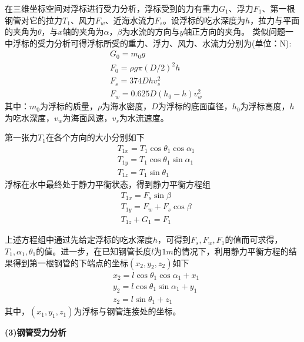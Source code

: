             \par
            在三维坐标空间对浮标进行受力分析，浮标受到的力有重力$G_1$、浮力$F_1$、第一根钢管对它的拉力$T_1$、风力$F_w$、近海水流力$F_s$。设浮标的吃水深度为$h$，拉力与平面的夹角为$\theta$，与$x$轴的夹角为$\alpha$，$\beta$为水流的方向与$y$轴正方向的夹角。
            类似问题一中浮标的受力分析可得浮标所受的重力、浮力、风力、水流力分别为(单位：N):
            \begin{align*}
            & G_0 = m_0g\\
            & F_0 = \rho g\pi ( D/2 )^2h\\
            & F_s = 374Dhv_s^2\\
            & F_w = 0.625D(h_0-h)v_w^2
            \end{align*}
            其中：$m_0$为浮标的质量，$\rho$为海水密度，$D$为浮标的底面直径，$h_0$为浮标高度，$h$为吃水深度，$v_w$为海面风速，$v_s$为水流速度。
            \par
            第一张力$T_1$在各个方向的大小分别如下
            \begin{align*}
            & T_{1x} = T_1\cos\theta_1\cos\alpha_1\\
            & T_{1y} = T_1\cos\theta_1\sin\alpha_1\\
            & T_{1z} = T_1\sin \theta_1
            \end{align*}
            浮标在水中最终处于静力平衡状态，得到静力平衡方程组
            \begin{align*}
            & T_{1x} = F_s\sin \beta\\
            & T_{1y} = F_w + F_s\cos\beta\\
            & T_{1z} + G_1 = F_1
            \end{align*}
            \par
            上述方程组中通过先给定浮标的吃水深度$h$，可得到$F_s,F_w,F_1$的值而可求得，$T_1,\alpha_1,\theta_1$的值。进一步，在已知钢管长度$l$为$1m$的情况下，利用静力平衡方程的结果得到第一根钢管的下端点的坐标$(x_2,y_2,z_2)$如下
            \begin{align*}
            & x_2 = l\cos\theta_1\cos\alpha_1+x_1\\
            & y_2 = l\cos\theta_1\sin\alpha_1+y_1\\
            & z_2 = l\sin\theta_1+z_1
            \end{align*}
            其中，$(x_1,y_1,z_1)$为浮标与钢管连接处的坐标。
            \par
            \textbf{(3)钢管受力分析}
            \par
